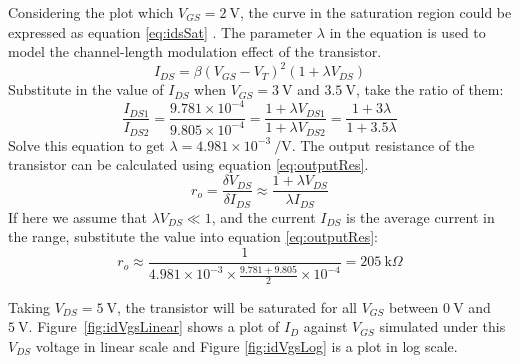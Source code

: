 \documentclass[12pt]{article}   %
\begin{document}
	Considering the plot which $V_{GS} = \SI{2}{\volt}$, the curve in the saturation region could be expressed as equation \eqref{eq:idsSat} \cite{mitraAnalogueElectronicsProject2024}. The parameter $\lambda$ in the equation is used to model the channel-length modulation effect of the transistor.
	\begin{equation}
		I_{DS} = \beta \left(V_{GS} - V_{T}\right)^2 \left(1 + \lambda V_{DS}\right)
		\label{eq:idsSat}
	\end{equation}
	Substitute in the value of $I_{DS}$ when $V_{GS} = \SI{3}{\volt}$ and $\SI{3.5}{\volt}$, take the ratio of them:
	\begin{equation}
		\frac{I_{DS1}}{I_{DS2}} = \frac{9.781 \times 10^{-4}}{9.805 \times 10^{-4}} = \frac{1 + \lambda V_{DS1}}{1 + \lambda V_{DS2}} = \frac{1 + 3\lambda}{1 + 3.5\lambda}
	\end{equation}
	Solve this equation to get $\lambda = 4.981 \times 10^{-3}\ \si{\per\volt}$. The output resistance of the transistor can be calculated using equation \eqref{eq:outputRes}\cite{mitraAnalogueElectronicsProject2024}. 
	\begin{equation}
		r_o = \frac{\delta V_{DS}}{\delta I_{DS}} \approx \frac{1 + \lambda V_{DS}}{\lambda I_{DS}}
		\label{eq:outputRes}
	\end{equation}
	If here we assume that $\lambda V_{DS} \ll 1$, and the current $I_{DS}$ is the average current in the range, substitute the value into equation \eqref{eq:outputRes}:
	\begin{equation}
		r_o \approx \frac{1}{4.981 \times 10^{-3} \times \frac{9.781 + 9.805}{2} \times 10^{-4}} = \SI{205}{\kilo\Omega}
		\label{eq:outputResistance}
	\end{equation}
	
	Taking $V_{DS} = \SI{5}{\volt}$, the transistor will be saturated for all $V_{GS}$ between $\SI{0}{\volt}$ and $\SI{5}{\volt}$. Figure~\ref{fig:idVgsLinear} shows a plot of $I_{D}$ against $V_{GS}$ simulated under this $V_{DS}$ voltage in linear scale and Figure \ref{fig:idVgsLog} is a plot in log scale.
	
\end{document}
